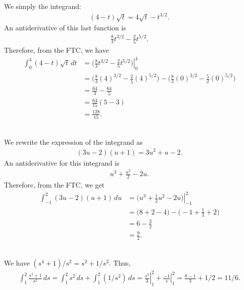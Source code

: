 	\spc
	
	\\
	We simply the integrand:
		\begin{align*}
		(4 - t) \sqrt{t} = 4 \sqrt{t} - t^{3/2} .
		\end{align*}
	An antiderivative of this last function is
		\begin{align*}
		\frac{8}{3} t^{3/2} - \frac{2}{5} t^{5/2} .
		\end{align*}
	Therefore, from the FTC, we have
		\begin{align*}
		\int_0^4 (4 - t)\sqrt{t} \, dt &= \left. \big( \tfrac{8}{3} t^{3/2} - \tfrac{2}{5} t^{5/2} \big) \right|_{0}^4  \\
		&= \big( \tfrac{8}{3} (4)^{3/2} - \tfrac{2}{5} (4)^{5/2} \big) - \big( \tfrac{8}{3} (0)^{3/2} - \tfrac{5}{2} (0)^{5/2} \big) \\
		&= \frac{64}{3} - \frac{64}{5} \\
		&= \frac{64}{15} (5 - 3) \\
		&= \frac{128}{15} .
		\end{align*}
	
	\spc
	
	\\
	We rewrite the expression of the integrand as
		\begin{align*}
		(3u - 2) (u + 1) = 3u^2 + u - 2 .
		\end{align*}
	An antiderivative for this integrand is
		\begin{align*}
		u^3 + \frac{u^2}{2} - 2u .
		\end{align*}
	Therefore, from the FTC, we get
		\begin{align*}
		\int_{-1}^2 (3u - 2) (u + 1) \, du &= \left. \big( u^3 + \tfrac{1}{2} u^2 - 2u \big) \right|_{-1}^2 \\
		&= \big( 8 + 2 - 4 \big) - \big( -1 + \tfrac{1}{2} + 2 \big) \\
		&= 6 - \tfrac{3}{2} \\
		&= \tfrac{9}{2} .
		\end{align*}
	
	\spc
	
	\\
	We have $(s^4 + 1)/s^2 = s^2 + 1/s^2$. Thus,
		\begin{align*}
		\int_1^2 \frac{s^4 + 1}{s^2} \, ds = \int_1^2 s^2 \, ds + \int_1^2 (1/s^2) \, ds = \left. \frac{s^3}{3} \right|_1^2 + \left. \frac{-1}{s} \right|_1^2 = \frac{8 - 1}{3} + 1/2 = 11/6 .
		\end{align*}
		
